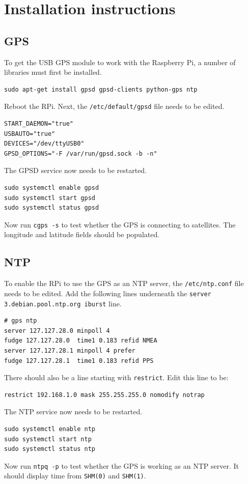 \documentclass[11pt,twosided,a4paper]{report}
\begin{document}
\clearpage
\newpage
{}


\pagebreak

\appendix

\chapter{Installation instructions}

\section{GPS} \label{GPS}

To get the USB GPS module to work with the Raspberry Pi, a number of libraries must first be installed.
\begin{lstlisting}
sudo apt-get install gpsd gpsd-clients python-gps ntp
\end{lstlisting}
Reboot the RPi. Next, the \texttt{/etc/default/gpsd} file needs to be edited.
\begin{lstlisting}
START_DAEMON="true"
USBAUTO="true"
DEVICES="/dev/ttyUSB0"
GPSD_OPTIONS="-F /var/run/gpsd.sock -b -n"
\end{lstlisting}
The GPSD service now needs to be restarted.
\begin{lstlisting}
sudo systemctl enable gpsd
sudo systemctl start gpsd
sudo systemctl status gpsd
\end{lstlisting}
Now run \texttt{cgps -s} to test whether the GPS is connecting to satellites. The longitude and latitude fields should be populated.

\section{NTP} \label{NTP}

To enable the RPi to use the GPS as an NTP server, the \texttt{/etc/ntp.conf} file needs to be edited. Add the following lines underneath the \texttt{server 3.debian.pool.ntp.org iburst} line.
\begin{lstlisting}
# gps ntp
server 127.127.28.0 minpoll 4
fudge 127.127.28.0  time1 0.183 refid NMEA
server 127.127.28.1 minpoll 4 prefer
fudge 127.127.28.1  time1 0.183 refid PPS
\end{lstlisting}
There should also be a line starting with \texttt{restrict}. Edit this line to be:
\begin{lstlisting}
restrict 192.168.1.0 mask 255.255.255.0 nomodify notrap
\end{lstlisting}
The NTP service now needs to be restarted.
\begin{lstlisting}
sudo systemctl enable ntp
sudo systemctl start ntp
sudo systemctl status ntp
\end{lstlisting}
Now run \texttt{ntpq -p} to test whether the GPS is working as an NTP server. It should display time from \texttt{SHM(0)} and \texttt{SHM(1)}.
\end{document}
